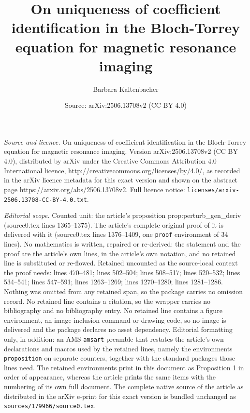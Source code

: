 \documentclass[10pt,a4paper]{amsart}
\title{On uniqueness of coefficient identification in the Bloch-Torrey equation for magnetic resonance imaging}
\author{Barbara Kaltenbacher}
\date{Source: arXiv:2506.13708v2 (CC BY 4.0)}
\begin{document}
\maketitle

\noindent\emph{Source and licence.} On uniqueness of coefficient identification in the Bloch-Torrey equation for magnetic resonance imaging. Version arXiv:2506.13708v2 (CC BY 4.0), distributed by arXiv under the Creative Commons Attribution 4.0 International licence, http://creativecommons.org/licenses/by/4.0/, as recorded in the arXiv licence metadata for this exact version and shown on the abstract page https://arxiv.org/abs/2506.13708v2. Full licence notice: \texttt{licenses/arxiv-2506.13708-CC-BY-4.0.txt}.\par\smallskip

\noindent\textit{Editorial scope.} Counted unit: the article's proposition prop:perturb\_gen\_deriv (source0.tex lines 1365--1375). The article's complete original proof of it is delivered with it (source0.tex lines 1376--1409, one \texttt{proof} environment of 34 lines). No mathematics is written, repaired or re-derived: the statement and the proof are the article's own lines, in the article's own notation, and no retained line is substituted or re-flowed.  Retained uncounted as the source-local context the proof needs: lines 470--481; lines 502--504; lines 508--517; lines 520--532; lines 534--541; lines 547--591; lines 1263--1269; lines 1270--1280; lines 1281--1286.  Nothing was omitted from any retained span, so the package carries no omission record.  No retained line contains a citation, so the wrapper carries no bibliography and no bibliography entry.  No retained line contains a figure environment, an image-inclusion command or drawing code, so no image is delivered and the package declares no asset dependency.  Editorial formatting only, in addition: an AMS \texttt{amsart} preamble that restates the article's own declarations and macros used by the retained lines, namely the environments \texttt{proposition} on separate counters, together with the standard packages those lines need.  The retained environments print in this document as Proposition 1 in order of appearance, whereas the article prints the same items with the numbering of its own full document.  The complete native source of the article as distributed in the arXiv e-print for this exact version is bundled unchanged as \texttt{sources/179966/source0.tex}.
\end{document}
